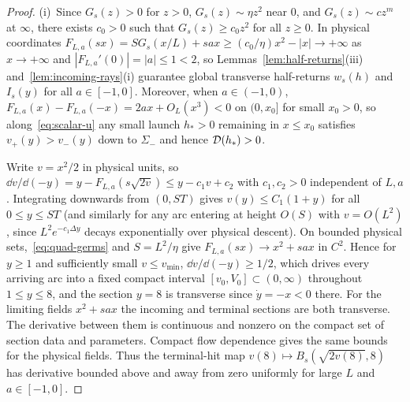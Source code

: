 \begin{proof}
(i)~Since $G_s(z)>0$ for $z>0$, $G_s(z)\sim\eta z^2$ near $0$, and $G_s(z)\sim c z^m$ at $\infty$, there exists $c_0>0$ such that $G_s(z)\ge c_0 z^2$ for all $z\ge 0$. In physical coordinates $F_{L,a}(sx)=SG_s(x/L)+sax\ge (c_0/\eta)x^2-|x|\to+\infty$ as $x\to+\infty$ and $|F_{L,a}'(0)|=|a|\le 1<2$, so Lemmas~\ref{lem:half-returns}(iii) and~\ref{lem:incoming-rays}(i) guarantee global transverse half-returns $w_s(h)$ and $I_s(y)$ for all $a\in[-1,0]$. Moreover, when $a\in(-1,0)$, $F_{L,a}(x)-F_{L,a}(-x)=2ax+O_L(x^3)<0$ on $(0,x_0]$ for small $x_0>0$, so along~\eqref{eq:scalar-u} any small launch $h_*>0$ remaining in $x\le x_0$ satisfies $v_+(y)>v_-(y)$ down to $\Sigma_-$ and hence $\mathcal{D}(h_*)>0$.

Write $v=x^2/2$ in physical units, so $\dd v/\dd(-y)=y-F_{L,a}(s\sqrt{2v})\le y-c_1 v+c_2$ with $c_1,c_2>0$ independent of $L,a$. Integrating downwards from $(0,ST)$ gives $v(y)\le C_1(1+y)$ for all $0\le y\le ST$ (and similarly for any arc entering at height $O(S)$ with $v=O(L^2)$, since $L^2 e^{-c_1\Delta y}$ decays exponentially over physical descent). On bounded physical sets,~\eqref{eq:quad-germs} and $S=L^2/\eta$ give $F_{L,a}(sx)\to x^2+sax$ in $C^2$. Hence for $y\ge 1$ and sufficiently small $v\le v_{\min}$, $\dd v/\dd(-y)\ge 1/2$, which drives every arriving arc into a fixed compact interval $[v_0,V_0]\subset(0,\infty)$ throughout $1\le y\le 8$, and the section $y=8$ is transverse since $\dot y=-x<0$ there.
For the limiting fields $x^2+sax$ the incoming and terminal sections
are both transverse. The derivative between them is continuous and
nonzero on the compact set of section data and parameters. Compact
flow dependence gives the same bounds for the physical fields. Thus the terminal-hit map $v(8)\mapsto B_s(\sqrt{2v(8)},8)$ has derivative bounded above and away from zero uniformly for large $L$ and $a\in[-1,0]$.


\end{proof}
